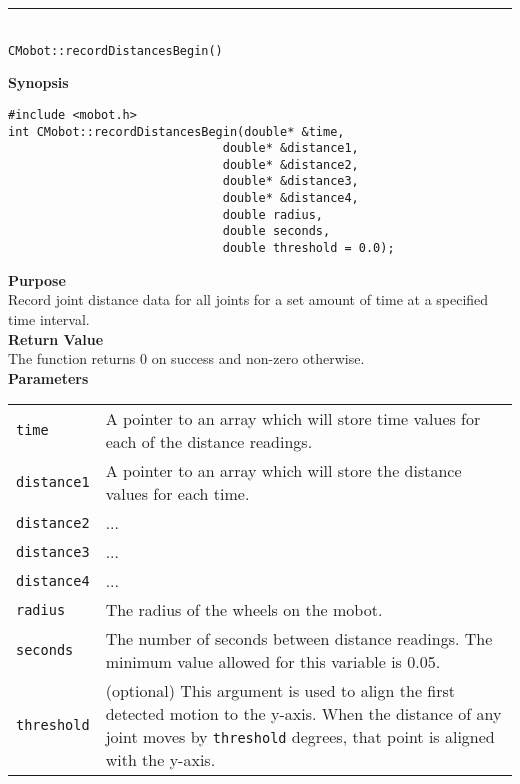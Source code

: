 \noindent
\vspace{5pt}
\rule{4.5in}{0.015in}\\
\noindent
{\LARGE \texttt{CMobot::recordDistancesBegin()}}\\
{}

\noindent
{\bf Synopsis}
\vspace{-8pt}
\begin{verbatim}
#include <mobot.h>
int CMobot::recordDistancesBegin(double* &time, 
                              double* &distance1, 
                              double* &distance2, 
                              double* &distance3, 
                              double* &distance4, 
                              double radius,
                              double seconds,
                              double threshold = 0.0);
\end{verbatim}

\noindent
{\bf Purpose}\\
Record joint distance data for all joints for a set amount of time at a specified time interval.\\

\noindent
{\bf Return Value}\\
The function returns 0 on success and non-zero otherwise.\\

\noindent
{\bf Parameters}\\
\vspace{-0.1in}
\begin{description}
\item               
\begin{tabular}{p{15 mm}p{145 mm}}
\texttt{time} & A pointer to an array which will store time values for each of the distance readings. \\
\texttt{distance1} & A pointer to an array which will store the distance values for each time. \\
\texttt{distance2} & ... \\
\texttt{distance3} & ... \\
\texttt{distance4} & ... \\
\texttt{radius} & The radius of the wheels on the mobot. \\
\texttt{seconds} & The number of seconds between distance readings. The minimum value allowed for
this variable is 0.05. \\
\texttt{threshold} & (optional) This argument is used to align the first
detected motion to the y-axis. When the distance of any joint moves by
\texttt{threshold} degrees, that point is aligned with the y-axis.
\end{tabular}
\end{description}

